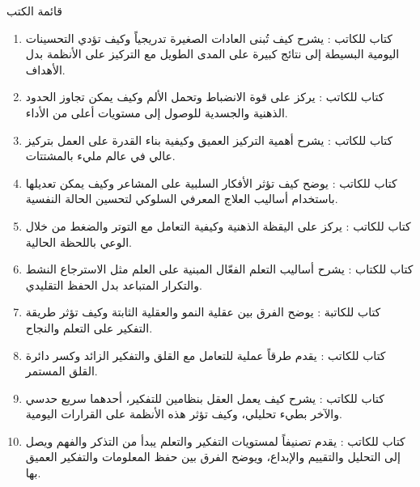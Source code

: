 \documentclass[12pt,a4paper]{book}
\begin{document}
قائمة الكتب
\begin{enumerate}
	\item كتاب  للكاتب : يشرح كيف تُبنى العادات الصغيرة تدريجياً وكيف تؤدي التحسينات اليومية البسيطة إلى نتائج كبيرة على المدى الطويل مع التركيز على الأنظمة بدل الأهداف.
	
	\item كتاب  للكاتب : يركز على قوة الانضباط وتحمل الألم وكيف يمكن تجاوز الحدود الذهنية والجسدية للوصول إلى مستويات أعلى من الأداء.
	
	\item كتاب  للكاتب : يشرح أهمية التركيز العميق وكيفية بناء القدرة على العمل بتركيز عالي في عالم مليء بالمشتتات.
	
	\item كتاب  للكاتب : يوضح كيف تؤثر الأفكار السلبية على المشاعر وكيف يمكن تعديلها باستخدام أساليب العلاج المعرفي السلوكي لتحسين الحالة النفسية.
	
	\item كتاب  للكاتب : يركز على اليقظة الذهنية وكيفية التعامل مع التوتر والضغط من خلال الوعي باللحظة الحالية.
	
	\item كتاب  للكتاب : يشرح أساليب التعلم الفعّال المبنية على العلم مثل الاسترجاع النشط والتكرار المتباعد بدل الحفظ التقليدي.
	
	\item كتاب  للكاتبة : يوضح الفرق بين عقلية النمو والعقلية الثابتة وكيف تؤثر طريقة التفكير على التعلم والنجاح.
	
	\item كتاب  للكاتب : يقدم طرقاً عملية للتعامل مع القلق والتفكير الزائد وكسر دائرة القلق المستمر.
	
	\item كتاب  للكاتب : يشرح كيف يعمل العقل بنظامين للتفكير، أحدهما سريع حدسي والآخر بطيء تحليلي، وكيف تؤثر هذه الأنظمة على القرارات اليومية.
	
	\item كتاب  للكاتب : يقدم تصنيفاً لمستويات التفكير والتعلم يبدأ من التذكر والفهم ويصل إلى التحليل والتقييم والإبداع، ويوضح الفرق بين حفظ المعلومات والتفكير العميق بها.
	
\end{enumerate}
\end{document}
